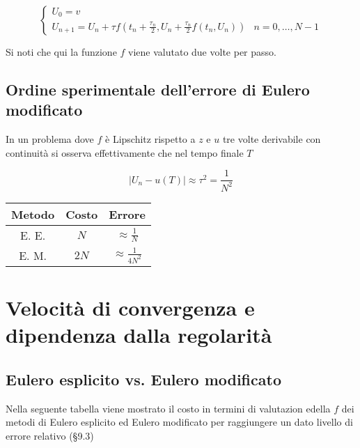 \documentclass[hidelinks, 10pt]{report}
\begin{document}
\[
\begin{cases}
U_{0} = v \\
U_{n + 1} = U_{n} + \tau f \left( t_{n} + \frac{\tau_{n}}{2}, U_{n} + \frac{\tau_{n}}{2} f(t_{n}, U_{n}) \right)	 & n = 0, \dotsc, N - 1
\end{cases}
\]

Si noti che qui la funzione $ f $ viene valutato due volte per passo. 

\subsection{Ordine sperimentale dell'errore di Eulero modificato}
In un problema dove $ f $ \`e Lipschitz rispetto a  $ z $ e $ u $ tre volte derivabile con continuit\`a si osserva effettivamente che nel tempo finale $ T $

\[ \vert U_{n} - u(T) \vert \approx \tau^{2} = \frac{1}{N^{2}} \]

\begin{center}
\begin{tabular}{c|c|c}
	Metodo & Costo & Errore \\
\hline
	E. E. & $ N $ & $ \approx \frac{1}{N} $ \\
\hline
	E. M. & $ 2N $ & $ \approx \frac{1}{4N^{2}} $ \\
\end{tabular}
\end{center}

\section{Velocit\`a di convergenza e dipendenza dalla regolarit\`a}
\subsection{Eulero esplicito vs. Eulero modificato}

Nella seguente tabella viene mostrato il costo in termini di valutazion edella $ f $ dei metodi di Eulero esplicito ed Eulero modificato per raggiungere un dato livello di errore relativo (\S 9.3)
\end{document}
